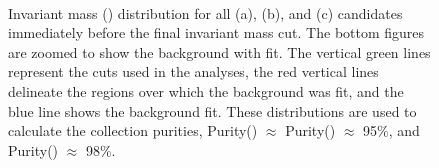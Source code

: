 \documentclass[/home/jesse/Analysis/Dissertation/ThesisBuxton.tex]{subfiles}
\begin{document}
\begin{figure}[h!]
  \centering
  \\
  \caption[V0 (\Lam, \ALam, \Ks) Purities]{Invariant mass (\minv) distribution for all \Lam (a), \ALam (b), and \Ks (c) candidates immediately before the final invariant mass cut.  The bottom figures are zoomed to show the background with fit.  The vertical green lines represent the \minv cuts used in the analyses, the red vertical lines delineate the regions over which the background was fit, and the blue line shows the background fit.  These distributions are used to calculate the collection purities, Purity(\Lam) $\approx$ Purity(\ALam) $\approx$ 95\%, and Purity(\Ks) $\approx$ 98\%.}
  \label{fig:Purities}
\end{figure}
\end{document}
